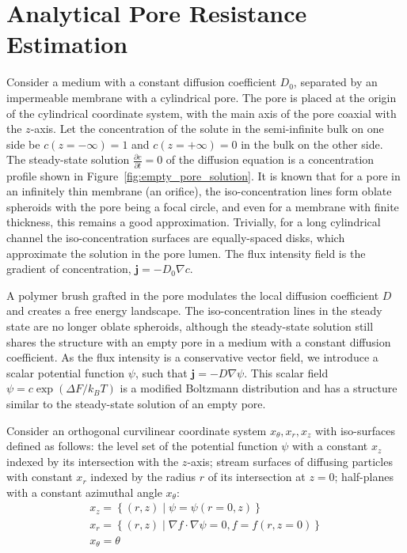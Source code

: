 \documentclass[10pt, a4paper]{article}
\begin{document}
\section{Analytical Pore Resistance Estimation}
\begin{multicols}{2}



Consider a medium with a constant diffusion coefficient $D_0$, separated by an impermeable membrane with a cylindrical pore.
The pore is placed at the origin of the cylindrical coordinate system, with the main axis of the pore coaxial with the $z$-axis.
Let the concentration of the solute in the semi-infinite bulk on one side be $c(z = -\infty) = 1$ and $c(z = +\infty) = 0$ in the bulk on the other side.
The steady-state solution $\frac{\partial c}{\partial t} = 0$ of the diffusion equation is a concentration profile shown in Figure~\ref{fig:empty_pore_solution}.
It is known that for a pore in an infinitely thin membrane (an orifice), the iso-concentration lines form oblate spheroids with the pore being a focal circle, and even for a membrane with finite thickness, this remains a good approximation.
Trivially, for a long cylindrical channel the iso-concentration surfaces are equally-spaced disks, which approximate the solution in the pore lumen.
The flux intensity field is the gradient of concentration, $\mathbf{j} = -D_0 \nabla c$.

A polymer brush grafted in the pore modulates the local diffusion coefficient $D$ and creates a free energy landscape.
The iso-concentration lines in the steady state are no longer oblate spheroids, although the steady-state solution still shares the structure with an empty pore in a medium with a constant diffusion coefficient.
As the flux intensity is a conservative vector field, we introduce a scalar potential function $\psi$, such that $\mathbf{j} = -D \nabla \psi$.
This scalar field $\psi = c \exp(\Delta F / k_B T)$ is a modified Boltzmann distribution and has a structure similar to the steady-state solution of an empty pore.

Consider an orthogonal curvilinear coordinate system $x_{\theta}, x_{r}, x_{z}$ with iso-surfaces defined as follows:
the level set of the potential function $\psi$ with a constant $x_{z}$ indexed by its intersection with the $z$-axis;
stream surfaces of diffusing particles with constant $x_{r}$ indexed by the radius $r$ of its intersection at $z = 0$;
half-planes with a constant azimuthal angle $x_{\theta}$:
\begin{gather}
    x_z = \left\{ (r, z) \mid \psi = \psi(r = 0, z) \right\}
    \\
    x_r = \left\{ (r, z) \mid \nabla f \cdot \nabla \psi = 0, f = f(r, z = 0) \right\}
    \\
    x_{\theta} = \theta
\end{gather}


\end{multicols}
\end{document}
